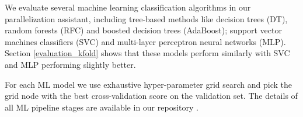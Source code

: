We evaluate several machine learning classification algorithms in our parallelization assistant, including tree-based methods like decision trees (DT), random forests (RFC) and boosted decision trees (AdaBoost); support vector machines classifiers (SVC) and multi-layer perceptron neural networks (MLP). Section \ref{evaluation_kfold} shows that these models perform similarly with SVC and MLP performing slightly better.


For each ML model we use exhaustive hyper-parameter grid search and pick the grid node with the best cross-validation score on the validation set.  The details of all ML pipeline stages are available in our repository \cite{assistant-repo}.

